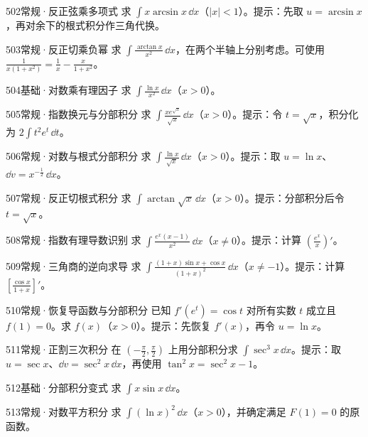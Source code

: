 \begin{exercise}{502}{常规·反正弦乘多项式}
求 $\int x\arcsin x\,\dd x$（$|x|<1$）。提示：先取 $u=\arcsin x$，再对余下的根式积分作三角代换。
\end{exercise}
\begin{exercise}{503}{常规·反正切乘负幂}
求 $\int\frac{\arctan x}{x^2}\,\dd x$，在两个半轴上分别考虑。可使用 $\frac{1}{x(1+x^2)}=\frac{1}{x}-\frac{x}{1+x^2}$。
\end{exercise}
\begin{exercise}{504}{基础·对数乘有理因子}
求 $\int\frac{\ln x}{x^2}\,\dd x$（$x>0$）。
\end{exercise}
\begin{exercise}{505}{常规·指数换元与分部积分}
求 $\int\frac{xe^{\sqrt x}}{\sqrt x}\,\dd x$（$x>0$）。提示：令 $t=\sqrt x$，积分化为 $2\int t^2e^t\,\dd t$。
\end{exercise}
\begin{exercise}{506}{常规·对数与根式分部积分}
求 $\int\frac{\ln x}{\sqrt x}\,\dd x$（$x>0$）。提示：取 $u=\ln x$、$\dd v=x^{-\frac{1}{2}}\,\dd x$。
\end{exercise}
\begin{exercise}{507}{常规·反正切根式积分}
求 $\int\arctan\sqrt x\,\dd x$（$x>0$）。提示：分部积分后令 $t=\sqrt x$。
\end{exercise}
\begin{exercise}{508}{常规·指数有理导数识别}
求 $\int\frac{e^x(x-1)}{x^2}\,\dd x$（$x\ne0$）。提示：计算 $(\frac{e^x}{x})'$。
\end{exercise}
\begin{exercise}{509}{常规·三角商的逆向求导}
求 $\int\frac{(1+x)\sin x+\cos x}{(1+x)^2}\,\dd x$（$x\ne-1$）。提示：计算 $[\frac{\cos x}{1+x}]'$。
\end{exercise}
\begin{exercise}{510}{常规·恢复导函数与分部积分}
已知 $f'(e^t)=\cos t$ 对所有实数 $t$ 成立且 $f(1)=0$。求 $f(x)$（$x>0$）。提示：先恢复 $f'(x)$，再令 $u=\ln x$。
\end{exercise}
\begin{exercise}{511}{常规·正割三次积分}
在 $(-\frac{\pi}{2},\frac{\pi}{2})$ 上用分部积分求 $\int\sec^3x\,\dd x$。提示：取 $u=\sec x$、$\dd v=\sec^2x\,\dd x$，再使用 $\tan^2x=\sec^2x-1$。
\end{exercise}
\begin{exercise}{512}{基础·分部积分变式}
求 $\int x\sin x\,\dd x$。
\end{exercise}
\begin{exercise}{513}{常规·对数平方积分}
求 $\int(\ln x)^2\,\dd x$（$x>0$），并确定满足 $F(1)=0$ 的原函数。
\end{exercise}
